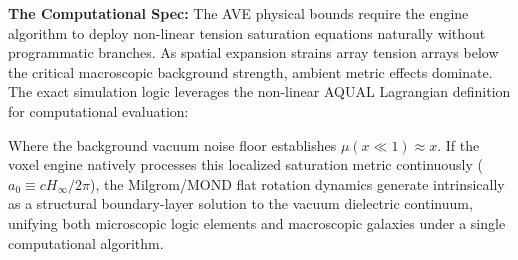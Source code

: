 \textbf{The Computational Spec:} The AVE physical bounds require the engine algorithm to deploy non-linear tension saturation equations naturally without programmatic branches. As spatial expansion strains array tension arrays below the critical macroscopic background strength, ambient metric effects dominate. The exact simulation logic leverages the non-linear AQUAL Lagrangian definition for computational evaluation:

Where the background vacuum noise floor establishes $\mu(x \ll 1) \approx x$. If the voxel engine natively processes this localized saturation metric continuously ($a_0 \equiv c H_\infty / 2\pi$), the Milgrom/MOND flat rotation dynamics generate intrinsically as a structural boundary-layer solution to the vacuum dielectric continuum, unifying both microscopic logic elements and macroscopic galaxies under a single computational algorithm.

